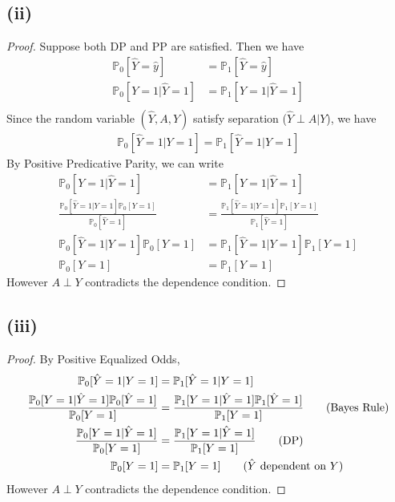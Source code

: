 \documentclass[twoside,11pt]{homework}
\begin{document}
\subsection*{(ii)}
	\begin{proof}
		Suppose both DP and PP are satisfied.
		Then we have 
		\begin{align*}
			\mathbb{P}_0[\hat{Y}=\hat{y}] &= \mathbb{P}_1 [\hat{Y}=\hat{y}] \tag{DP} \\
			\mathbb{P}_0[Y=1 | \hat{Y}=1] &= \mathbb{P}_1[Y=1 | \hat{Y}=1] \tag{Positive PP} \\
		\end{align*}
		Since the random variable $(\hat{Y},A,Y)$ satisfy separation ($\hat{Y}\perp A|Y$), we have
		\begin{align*}
			\mathbb{P}_0[\hat{Y}=1|Y=1] = \mathbb{P}_1[\hat{Y}=1|Y=1] 
		\end{align*}
		By Positive Predicative Parity, we can write
		\begin{align*}
			\mathbb{P}_0[Y=1 | \hat{Y}=1] &= \mathbb{P}_1[Y=1 | \hat{Y}=1] \\
			\frac{\mathbb{P}_0[\hat{Y}=1|Y=1] \mathbb{P}_0[Y=1] }{\mathbb{P}_0[\hat{Y}=1] } 
			&= \frac{\mathbb{P}_1[\hat{Y}=1|Y=1] \mathbb{P}_1[Y=1] }{ \mathbb{P}_1[\hat{Y}=1] } \tag{Bayes Rule} \\
			\mathbb{P}_0[\hat{Y}=1|Y=1] \mathbb{P}_0[Y=1] &= \mathbb{P}_1[\hat{Y}=1|Y=1] \mathbb{P}_1[Y=1] \tag{DP}\\
			\mathbb{P}_0[Y=1] &= \mathbb{P}_1[Y=1] \tag{Separation Condition}
		\end{align*}
		However $A\perp Y$ contradicts the dependence condition.
	\end{proof}
\subsection*{(iii)}
	\begin{proof}
		By Positive Equalized Odds, 
		\begin{align*}
			\mathbb{P}_0[ \hat{Y}=1|Y=1] &= \mathbb{P}_1[\hat{Y}=1|Y=1] \\
			\frac{\mathbb{P}_0[Y=1|\hat{Y}=1] \mathbb{P}_0[\hat{Y}=1] }{\mathbb{P}_0[{Y}=1] } 
			&= \frac{\mathbb{P}_1[Y=1|\hat{Y}=1] \mathbb{P}_1[\hat{Y}=1] }{ \mathbb{P}_1[{Y}=1] } \tag{Bayes Rule} \\
			\frac{\mathbb{P}_0[Y=1|\hat{Y}=1]}{\mathbb{P}_0[{Y}=1] } 
			&= \frac{\mathbb{P}_1[Y=1|\hat{Y}=1]}{ \mathbb{P}_1[{Y}=1] } \tag{DP}\\
			\mathbb{P}_0[Y=1] &= \mathbb{P}_1[Y=1] \tag{$\hat{Y}$ dependent on $Y$}
		\end{align*}
		However $A\perp Y$ contradicts the dependence condition.
	\end{proof}
\end{document}
